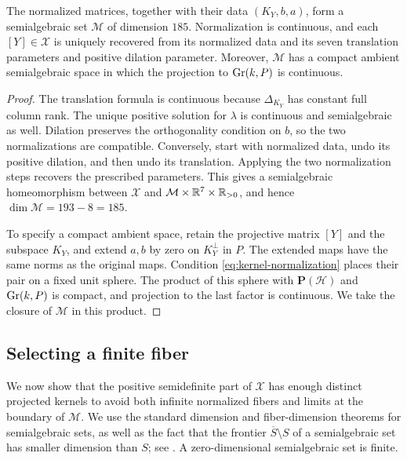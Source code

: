 \begin{lemma}
\label{lem:hankel-normalization}
The normalized matrices, together with their data $(K_Y,b,a)$, form
a semialgebraic set $\mathcal M$ of dimension $185$. Normalization is
continuous, and each $[Y]\in\mathcal X$ is uniquely recovered from
its normalized data and its seven translation parameters and positive
dilation parameter. Moreover, $\mathcal M$ has a compact ambient
semialgebraic space in which the projection to $\operatorname{Gr}(k,P)$ is
continuous.
\end{lemma}

\begin{proof}
The translation formula is continuous because $\Delta_{K_Y}$ has
constant full column rank. The unique positive solution for $\lambda$
is continuous and semialgebraic as well. Dilation preserves the
orthogonality condition on $b$, so the two normalizations are compatible.
Conversely, start with normalized data, undo its positive dilation,
and then undo its translation. Applying the two normalization steps
recovers the prescribed parameters. This gives a semialgebraic
homeomorphism between $\mathcal X$ and
$\mathcal M\times\mathbb R^7\times\mathbb R_{>0}$, and hence
$\dim\mathcal M=193-8=185$.

To specify a compact ambient space, retain the projective matrix
$[Y]$ and the subspace $K_Y$, and extend $a,b$ by zero on $K_Y^\perp$
in $P$. The extended maps have the same norms as the original maps.
Condition \eqref{eq:kernel-normalization} places their pair on a
fixed unit sphere. The product of this sphere with
$\mathbf P(\mathcal H)$ and $\operatorname{Gr}(k,P)$ is compact, and projection
to the last factor is continuous. We take the closure of
$\mathcal M$ in this product.
\end{proof}

\subsection{Selecting a finite fiber}

We now show that the positive semidefinite part of $\mathcal X$ has
enough distinct projected kernels to avoid both infinite normalized
fibers and limits at the boundary of $\mathcal M$. We use the standard
dimension and fiber-dimension theorems for semialgebraic sets, as well
as the fact that the frontier $\overline S\setminus S$ of a
semialgebraic set has smaller dimension than $S$; see
\cite{BCR1998}. A zero-dimensional semialgebraic set is finite.

